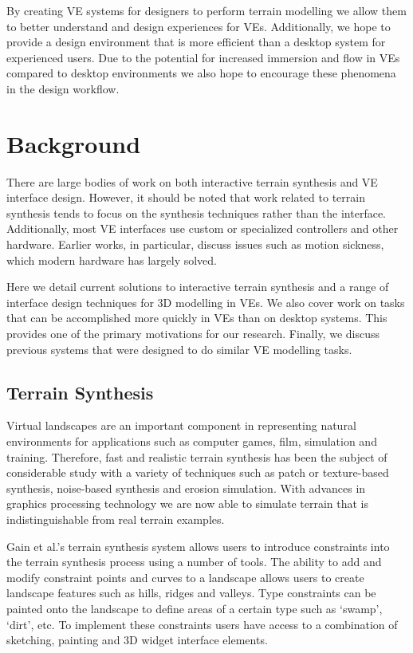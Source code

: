 \documentclass{sig-alternate-05-2015}
\begin{document}
By creating VE systems for designers to perform terrain modelling we allow them to better understand and design experiences for VEs. Additionally, we hope to provide a design environment that is more efficient than a desktop system for experienced users. Due to the potential for increased immersion and flow in VEs compared to desktop environments\cite{Schubert2001} we also hope to encourage these phenomena in the design workflow.
\section{Background}
There are large bodies of work on both interactive terrain synthesis and VE interface design. However, it should be noted that work related to terrain synthesis tends to focus on the synthesis techniques rather than the interface. Additionally, most VE interfaces use custom or specialized controllers and other hardware. Earlier works, in particular, discuss issues such as motion sickness, which modern hardware has largely solved.
 
Here we detail current solutions to interactive terrain synthesis and a range of interface design techniques for 3D modelling in VEs. We also cover work on tasks that can be accomplished more quickly in VEs than on desktop systems. This provides one of the primary motivations for our research. Finally, we discuss previous systems that were designed to do similar VE modelling tasks.
 
\subsection{Terrain Synthesis} 
Virtual landscapes are an important component in representing natural environments for applications such as computer games, film, simulation and training\cite{Gain2015}. Therefore, fast and realistic terrain synthesis has been the subject of considerable study with a variety of techniques such as patch or texture-based synthesis\cite{Cruz2015, Tasse2012}, noise-based synthesis\cite{Musgrave1989} and erosion simulation\cite{Anh2007}. With advances in graphics processing technology we are now able to simulate terrain that is indistinguishable from real terrain examples\cite{Gain2015}. 

Gain et al.'s terrain synthesis system allows users to introduce constraints into the terrain synthesis process using a number of tools\cite{Gain2015}. The ability to add and modify constraint points and curves to a landscape allows users to create landscape features such as hills, ridges and valleys. Type constraints can be painted onto the landscape to define areas of a certain type such as `swamp', `dirt', etc. To implement these constraints users have access to a combination of sketching, painting and 3D widget interface elements.
\end{document}
